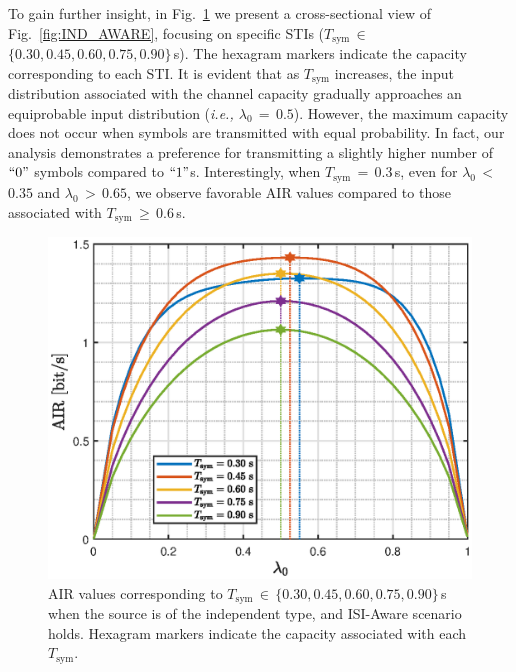 \documentclass[journal]{IEEEtranTCOM}
\begin{document}
To gain further insight, in Fig.~\ref{fig:Cross_AIR_ISIA_Tsym} we present a cross-sectional view of Fig.~\ref{fig:IND_AWARE}, focusing on specific STIs ($T_{\mathrm{sym}}$$\,\in\,$$\{0.30,0.45,0.60,0.75,0.90\}$\,s). The hexagram markers indicate the capacity corresponding to each STI. It is evident that as $T_{\mathrm{sym}}$ increases, the input distribution associated with the channel capacity gradually approaches an equiprobable input distribution (\textit{i.e., $\lambda_{0}$$\,=\,$$0.5$}). However, the maximum capacity does not occur when symbols are transmitted with equal probability. In fact, our analysis demonstrates a preference for transmitting a slightly higher number of $``0"$ symbols compared to $``1"$s. Interestingly, when $T_{\mathrm{sym}}$$\,=\,$$0.3$\,s, even for $\lambda_{0}$$\,<\,$$0.35$ and $\lambda_{0}$$\,>\,$$0.65$, we observe favorable AIR values compared to those associated with $T_{\mathrm{sym}}$$\,\geq\,$$ 0.6$\,s.
\begin{figure}
    \centering
    \includegraphics[width=1\linewidth]{Figures/cross_AIR_IND_AWARE.eps}
    \caption{AIR values corresponding to $T_{\mathrm{sym}}$$\,\in\,$$\{0.30,0.45,0.60,0.75,0.90\}$\,s when the source is of the independent type, and ISI-Aware scenario holds. Hexagram markers indicate the capacity associated with each $T_{\mathrm{sym}}$.}
    \label{fig:Cross_AIR_ISIA_Tsym}
\end{figure}
\end{document}

